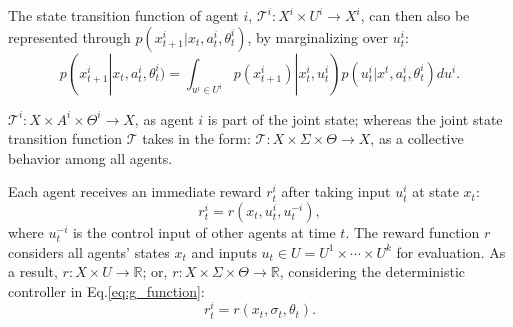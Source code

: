 \documentclass[letterpaper, 10 pt, conference]{ieeeconf}  %
\begin{document}
The state transition function of agent $i$, 
$\mathcal{T}^i:X^i \times U^i \rightarrow X^i$, can then also be represented 
through
$p(x^i_{t+1}|x_t,a^i_t,\theta^i_t)$, by marginalizing over $u^i_t$:
\begin{equation}
  p(x^i_{t+1}|x_t,a^i_t,\theta^i_t) = \int_{u^i \in U^i} 
  p(x_{t+1}^i)|x^i_t,u^i_t) p(u^i_t|x^t,a^i_t,\theta^i_t)du^i.
\end{equation}

$\mathcal{T}^i:X \times A^i \times \Theta^i \rightarrow X$, as agent $i$ is 
part of the joint state; whereas the joint 
state transition function $\mathcal{T}$ takes in the form: 
$\mathcal{T}:X \times \Sigma \times \Theta \rightarrow X$, as a collective 
behavior among all agents. 

Each agent receives an immediate reward $r^i_t$ 
after taking input $u_t^i$ at state $x_t$:
\begin{equation}\label{eq:r_control_input}
  r^i_t = r(x_t,u^i_t,u^{-i}_t),
\end{equation}
where $u^{-i}_t$ is the control input of other agents at time $t$. The reward 
function $r$ considers all agents' states $x_t$ and inputs 
$u_t \in U = U^1\times \cdots \times U^k$ for evaluation.
As a result, $r: X \times U \rightarrow \mathbb{R}$; or, 
$r: X\times \Sigma \times \Theta \rightarrow \mathbb{R}$, considering the 
deterministic controller in Eq.\ref{eq:g_function}:
\begin{equation}\label{eq:r_function}
  r^i_t = r(x_t,\sigma_t,\theta_t).
\end{equation}


\end{document}

